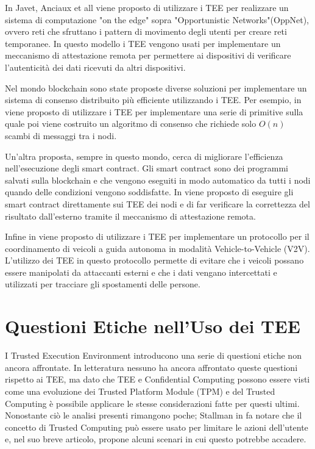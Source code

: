 \documentclass[12pt,italian]{report}
\begin{document}
\bigbreak \noindent

In Javet, Anciaux et all\cite{teeuses_edgeletcomputing} viene proposto di
utilizzare i TEE per realizzare un sistema di computazione "on the edge" sopra
"Opportunistic Networks"(OppNet), ovvero reti che sfruttano i
pattern di movimento degli utenti per creare reti temporanee.
In questo modello i TEE vengono usati per implementare un meccanismo di
attestazione remota per permettere ai dispositivi di verificare l'autenticità
dei dati ricevuti da altri dispositivi.

\bigbreak \noindent

Nel mondo blockchain sono state proposte diverse soluzioni per implementare
un sistema di consenso distribuito più efficiente utilizzando i TEE.
Per esempio, in \cite{teeuses_blockchainconsent} viene proposto di utilizzare
i TEE per implementare una serie di primitive sulla quale poi viene
costruito un algoritmo di consenso che richiede solo $O(n)$ scambi di messaggi
tra i nodi.

Un'altra proposta, sempre in questo mondo, cerca di migliorare l'efficienza
nell'esecuzione degli smart contract.
Gli smart contract sono dei programmi salvati sulla blockchain e che vengono
eseguiti in modo automatico da tutti i nodi quando delle condizioni vengono
soddisfatte.
In \cite{teeuses_smartcontract} viene proposto di eseguire gli smart contract
direttamente sui TEE dei nodi e di far verificare la correttezza del risultato
dall'esterno tramite il meccanismo di attestazione remota.

\bigbreak \noindent

Infine in \cite{teeuses_vehicles} viene proposto di utilizzare i TEE per
implementare un protocollo per il coordinamento di veicoli a guida
autonoma in modalità Vehicle-to-Vehicle (V2V).
L'utilizzo dei TEE in questo protocollo permette di evitare che i veicoli
possano essere manipolati da attaccanti esterni e che i dati vengano
intercettati e utilizzati per tracciare gli spostamenti delle persone. 

\section{Questioni Etiche nell'Uso dei TEE}
\label{sec:etica-tee}
I Trusted Execution Environment introducono una serie di questioni etiche
non ancora affrontate.
In letteratura nessuno ha ancora affrontato queste questioni rispetto ai TEE,
ma dato che TEE e Confidential Computing possono essere visti come una
evoluzione dei Trusted Platform Module (TPM) e del Trusted Computing 
è possibile applicare le stesse considerazioni fatte per questi ultimi.
Nonostante ciò le analisi presenti rimangono poche; Stallman in
\cite{stallman2021tpm} fa notare che il concetto di Trusted Computing può
essere usato per limitare le azioni dell'utente e, nel suo breve articolo,
propone alcuni scenari in cui questo potrebbe accadere. 
\end{document}
